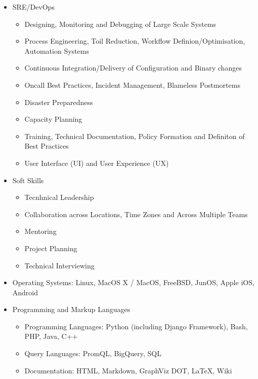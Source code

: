 \documentclass[a4paper, 10pt] {article}
\begin{document}
\begin{itemize}
\item SRE/DevOps
  \begin{itemize}
  \item Designing, Monitoring and Debugging of Large Scale Systems
  \item Process Engineering, Toil Reduction, Workflow Definion/Optimisation, Automation Systems
  \item Continuous Integration/Delivery of Configuration and Binary changes
  \item Oncall Best Practices, Incident Management, Blameless Postmortems
  \item Disaster Preparedness
  \item Capacity Planning
  \item Training, Technical Documentation, Policy Formation and Definiton of Best Practices
  \item User Interface (UI) and User Experience (UX)
  \end{itemize}
\item Soft Skills
  \begin{itemize}
  \item Tecnhnical Leadership
  \item Collaboration across Locations, Time Zones and Across Multiple Teams
  \item Mentoring
  \item Project Planning
  \item Technical Interviewing
  \end{itemize}
  \item Operating Systems: Linux, MacOS X / MacOS, FreeBSD, JunOS, Apple iOS, Android
\item Programming and Markup Languages
  \begin{itemize}
  \item Programming Languages: Python (including Django Framework), Bash, PHP, Java, C++
  \item Query Languages: PromQL, BigQuery, SQL
  \item Documentation: HTML, Markdown, GraphViz DOT, LaTeX, Wiki
  \end{itemize}
\end{itemize}  
\end{document}
